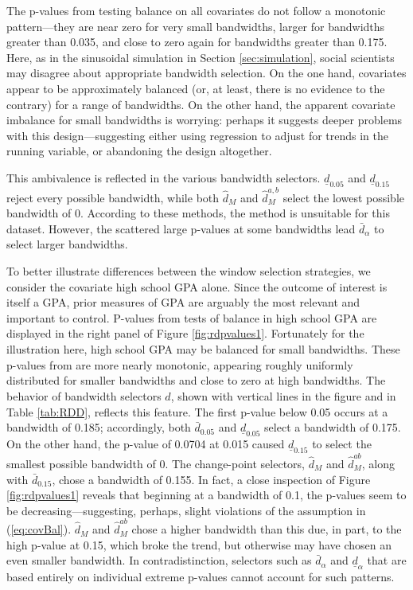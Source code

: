 \documentclass[sts]{imsart}\usepackage[]{graphicx}\usepackage[]{color}
\newcommand{\dalphaU}{\bar{d}_\alpha}
\newcommand{\dalphaB}{\underline{d}_\alpha}
\newcommand{\dhat}{\hat{d}}
\newcommand{\dhatU}{\bar{d}}
\newcommand{\dhatB}{\underline{d}}
\newcommand{\dhatm}{\hat{d}_M}
\newcommand{\dhatmab}{\hat{d}^{ab}_M}
\begin{document}
The p-values from testing balance on all covariates do not follow a
monotonic pattern---they are near zero for very small bandwidths,
larger for bandwidths greater than 0.035, and close to zero again for
bandwidths greater than 0.175.
Here, as in the sinusoidal simulation in Section \ref{sec:simulation},
social scientists may disagree about appropriate bandwidth selection.
On the one hand, covariates appear to be approximately balanced (or,
at least, there is no evidence to the contrary) for a range of
bandwidths.
On the other hand, the apparent covariate imbalance for small
bandwidths is worrying: perhaps it suggests deeper problems with this
design---suggesting either using regression to adjust for trends in
the running variable, or abandoning the design altogether.

This ambivalence is reflected in the various bandwidth selectors.
$\dhatB_{0.05}$ and $\dhatB_{0.15}$ reject every possible bandwidth, while
both $\dhatm$ and $\dhat_M^{a,b}$ select the lowest possible
bandwidth of 0.
According to these methods, the \citet{cft} method is unsuitable for this
dataset.
However, the scattered large p-values at some bandwidths lead
 $\dalphaU$ to select larger bandwidths.

To better illustrate differences between the window selection
strategies, we consider the covariate high school GPA alone.
Since the outcome of interest is itself a GPA, prior measures of GPA
are arguably the most relevant and important to control.
P-values from tests of balance in high school GPA are
displayed in the right panel of Figure \ref{fig:rdpvalues1}.
Fortunately for the illustration here, high school GPA may be
balanced for small bandwidths.
These p-values from are more nearly
monotonic, appearing roughly uniformly distributed for smaller
bandwidths and close to zero at high bandwidths.
The behavior of bandwidth selectors $\dhat$, shown with vertical lines
in the figure and in Table \ref{tab:RDD}, reflects this feature.
The first p-value below 0.05 occurs at a bandwidth of
0.185; accordingly, both $\dhatU_{0.05}$ and
$\dhatB_{0.05}$ select a bandwidth of 0.175.
On the other hand, the p-value of 0.0704 at 0.015
caused $\dhatB_{0.15}$ to select the smallest possible bandwidth of 0.
The change-point selectors, $\dhatm$ and $\dhatmab$, along with
$\dhatU_{0.15}$, chose a bandwidth of 0.155.
In fact, a close inspection of Figure \ref{fig:rdpvalues1} reveals
that beginning at a bandwidth of 0.1, the p-values seem to be
decreasing---suggesting, perhaps, slight violations of the assumption
in (\ref{eq:covBal}).
$\dhatm$ and $\dhatmab$ chose a higher bandwidth than this due, in
part, to the high p-value at 0.15, which broke the trend, but
otherwise may have chosen an even smaller bandwidth.
In contradistinction, selectors such as $\dalphaU$ and $\dalphaB$ that
are based entirely on individual extreme p-values cannot account for
such patterns.
\end{document}

